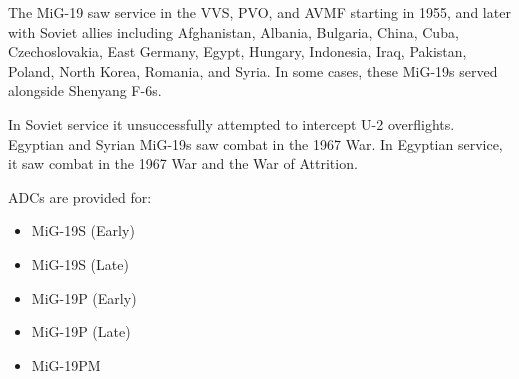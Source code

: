 The MiG-19 saw service in the VVS, PVO, and AVMF starting in 1955, and later with Soviet allies including Afghanistan, Albania, Bulgaria, China, Cuba, Czechoslovakia, East Germany, Egypt, Hungary, Indonesia, Iraq, Pakistan, Poland, North Korea, Romania, and Syria. In some cases, these MiG-19s served alongside Shenyang F-6s.

In Soviet service it unsuccessfully attempted to intercept U-2 overflights. Egyptian and Syrian MiG-19s saw combat in the 1967 War. In Egyptian service, it saw combat in the 1967 War and the War of Attrition.

ADCs are provided for:
\begin{itemize}
    \item MiG-19S (Early)
    \item MiG-19S (Late)
    \item MiG-19P (Early)
    \item MiG-19P (Late)
    \item MiG-19PM
\end{itemize}
